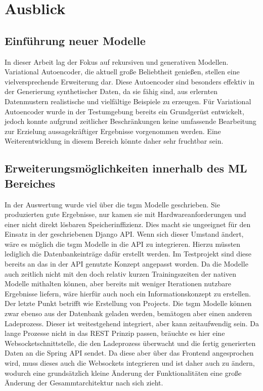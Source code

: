 
\chapter{Ausblick}
\label{ch:ausblick}

\section{Einführung neuer Modelle}
In dieser Arbeit lag der Fokus auf rekursiven und generativen Modellen. Variational Autoencoder, die aktuell große Beliebtheit genießen, stellen eine vielversprechende Erweiterung dar. Diese Autoencoder sind besonders effektiv in der 
Generierung synthetischer Daten, da sie fähig sind, aus erlernten Datenmustern realistische und vielfältige Beispiele zu erzeugen. Für Variational Autoencoder wurde in der Testumgebung bereits ein Grundgerüst entwickelt, 
jedoch konnte aufgrund zeitlicher Beschränkungen keine umfassende Bearbeitung zur Erzielung aussagekräftiger Ergebnisse vorgenommen werden. Eine Weiterentwicklung in diesem Bereich könnte daher sehr fruchtbar sein.



\section{Erweiterungsmöglichkeiten innerhalb des \ac{ML} Bereiches}
In der Auswertung wurde viel über die tsgm Modelle geschrieben. Sie produzierten gute Ergebnisse, nur kamen sie mit Hardwareanforderungen und einer nicht direkt lösbaren Speicherinffizienz.
Dies macht sie ungeeignet für den Einsatz in der geschriebenen Django API. Wenn sich dieser Umstand ändert, wäre es möglich die tsgm Modelle in die API zu integrieren.
Hierzu müssten lediglich die Datenbankeinträge dafür erstellt werden. Im Testprojekt sind diese bereits an das in der API genutzte Konzept angepasst worden.
Da die Modelle auch zeitlich nicht mit den doch relativ kurzen Trainingszeiten der nativen Modelle mithalten können, aber bereits mit weniger Iterationen nutzbare Ergebnisse liefern, wäre hierfür auch noch ein Informationskonzept zu erstellen.
Der letzte Punkt betrifft wie Erstellung von Projects. Die tsgm Modelle können zwar ebenso aus der Datenbank geladen werden, bemätogen aber einen anderen Ladeprozess.
Dieser ist weitestgehend integriert, aber kann zeitaufwendig sein. Da lange Prozesse nicht in das REST Prinzip passen, bräuchte es hier eine Websocketschnittstelle, 
die den Ladeprozess überwacht und die fertig generierten Daten an die Spring API sendet. Da diese aber über das Frontend angesprochen wird, muss dieses auch die Websockets integrieren und ist daher auch zu ändern, wodurch eine grundsätzlich kleine Änderung 
der Funktionalitäten eine große Änderung der Gesammtarchitektur nach sich zieht.

